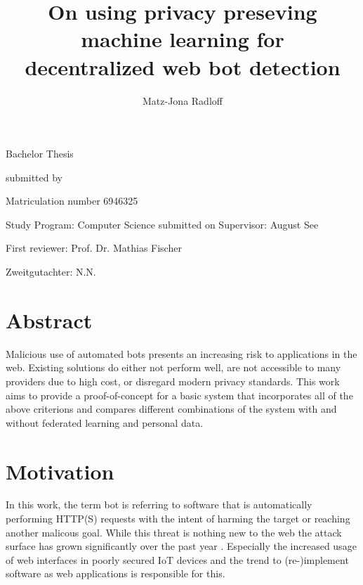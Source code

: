 \documentclass[
    fontsize=12pt,
    headings=small,
    parskip=half,           %
    bibliography=totoc,
    numbers=noenddot,       %
    open=any,               %
    final                   %
    ]{scrreprt}
\begin{document}
\title{On using privacy preseving machine learning for\\decentralized web bot detection}
\author{Matz-Jona Radloff}


\begin{titlepage}
\begin{center}\Large
	\vfill
    Bachelor Thesis
	\vfill
	\makeatletter
	{\Large\textsf{\textbf{\@title}}\par}
	\makeatother
	\vfill
    submitted by
	\par\bigskip
	\makeatletter
	{\@author} \par
	\makeatother
	Matriculation number 6946325 \par
	Study Program: Computer Science
	\vfill
	\makeatletter
	submitted on {\@date}
	\makeatother
	\vfill
	Supervisor: August See\par
	First reviewer: Prof. Dr. Mathias Fischer \par
	Zweitgutachter: N.N.
\end{center}
\end{titlepage}


\chapter*{Abstract}

Malicious use of automated bots presents an increasing risk to applications in the web. Existing solutions do either not perform well, are not accessible to many providers due to high cost, or disregard modern privacy standards. This work aims to provide a proof-of-concept for a basic system that incorporates all of the above criterions and compares different combinations of the system with and without federated learning and personal data.

\tableofcontents

\chapter{Motivation}

In this work, the term bot is referring to software that is automatically performing HTTP(S) requests with the intent of harming the target or reaching another malicous goal. While this threat is nothing new to the web the attack surface has grown significantly over the past year \cite{BAD_BOT_REPORT2020,BAD_BOT_REPORT2021}. Especially the increased usage of web interfaces in poorly secured IoT devices and the trend to (re-)implement software as web applications is responsible for this.
\end{document}
